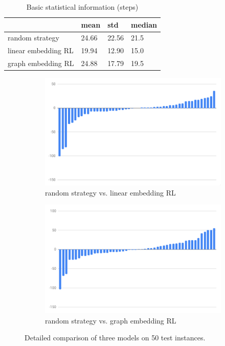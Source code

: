 \documentclass[sigplan,10pt]{acmart}\settopmatter{printfolios=true,printccs=false,printacmref=false}
\begin{document}
\begin{table}[]
\begin{tabular}{|l|l|l|l|}
\hline
           & mean  & std   & median \\ \hline
random strategy    & 24.66 & 22.56 & 21.5   \\ \hline
linear embedding RL & 19.94 & 12.90 & 15.0  \\ \hline
graph embedding RL  & 24.88 & 17.79 & 19.5  \\ \hline
\end{tabular}
\caption{Basic statistical information (steps)}
\end{table}

\begin{figure}[ht!]
  \centering
  \begin{subfigure}[b]{0.5\textwidth}
    \centering
    \includegraphics[scale=0.3]{random_vs_linear.png}
    \caption{random strategy vs. linear embedding RL}
  \end{subfigure}
  
  \begin{subfigure}[b]{0.5\textwidth}
    \centering
  \includegraphics[scale=0.3]{random_vs_graph.png}
  \caption{random strategy vs. graph embedding RL}
  \end{subfigure}

  \caption{Detailed comparison of three models on 50 test instances.}
\end{figure}
\end{document}
